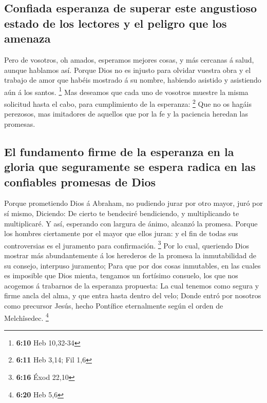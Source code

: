 \hypertarget{confiada-esperanza-de-superar-este-angustioso-estado-de-los-lectores-y-el-peligro-que-los-amenaza}{%
\subsection{Confiada esperanza de superar este angustioso estado de los
lectores y el peligro que los
amenaza}\label{confiada-esperanza-de-superar-este-angustioso-estado-de-los-lectores-y-el-peligro-que-los-amenaza}}

 Pero de vosotros, oh amados, esperamos mejores cosas, y más
cercanas á salud, aunque hablamos así.  Porque Dios no es
injusto para olvidar vuestra obra y el trabajo de amor que habéis
mostrado á su nombre, habiendo asistido y asistiendo aún á los santos.
\footnote{\textbf{6:10} Heb 10,32-34}  Mas deseamos que
cada uno de vosotros muestre la misma solicitud hasta el cabo, para
cumplimiento de la esperanza: \footnote{\textbf{6:11} Heb 3,14; Fil 1,6}
 Que no os hagáis perezosos, mas imitadores de aquellos que
por la fe y la paciencia heredan las promesas.

\hypertarget{el-fundamento-firme-de-la-esperanza-en-la-gloria-que-seguramente-se-espera-radica-en-las-confiables-promesas-de-dios}{%
\subsection{El fundamento firme de la esperanza en la gloria que
seguramente se espera radica en las confiables promesas de
Dios}\label{el-fundamento-firme-de-la-esperanza-en-la-gloria-que-seguramente-se-espera-radica-en-las-confiables-promesas-de-dios}}

 Porque prometiendo Dios á Abraham, no pudiendo jurar por
otro mayor, juró por sí mismo,  Diciendo: De cierto te
bendeciré bendiciendo, y multiplicando te multiplicaré.  Y
así, esperando con largura de ánimo, alcanzó la promesa. 
Porque los hombres ciertamente por el mayor que ellos juran: y el fin de
todas sus controversias es el juramento para confirmación. \footnote{\textbf{6:16}
  Éxod 22,10}  Por lo cual, queriendo Dios mostrar más
abundantemente á los herederos de la promesa la inmutabilidad de su
consejo, interpuso juramento;  Para que por dos cosas
inmutables, en las cuales es imposible que Dios mienta, tengamos un
fortísimo consuelo, los que nos acogemos á trabarnos de la esperanza
propuesta:  La cual tenemos como segura y firme ancla del
alma, y que entra hasta dentro del velo;  Donde entró por
nosotros como precursor Jesús, hecho Pontífice eternalmente según el
orden de Melchîsedec. \footnote{\textbf{6:20} Heb 5,6}

